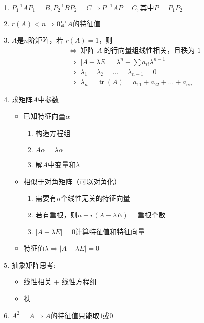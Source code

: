 \documentclass[a4paper,12pt]{article}
\begin{document}
\begin{enumerate}
\begin{align*}
            \text{ 则 } A(P\bm{\alpha}_B) = \lambda (P\bm{\alpha}_B)
            \Rightarrow {\color{red}{\bm{\alpha}_A = P\bm{\alpha}_B}}
        \end{align*}
        \item $P_1^{-1}AP_1 = B, P_2^{-1}BP_2 = C \Rightarrow P^{-1}AP = C, \text{其中}P = P_{1}P_2$
        \item $r(A) < n \Rightarrow 0 \text{是} A \text{的特征值}$
        \item $A$是$n$阶矩阵，若 $r(A) = 1$，则
        \begin{align*}
            &\Leftrightarrow\; \text{矩阵 $A$ 的行向量组线性相关，且秩为 1}  \\
            &\Rightarrow\; |A - \lambda E| = \lambda^n - \sum a_{ii}\lambda^{n-1}  \\
            &\Rightarrow\; \lambda_1 = \lambda_2 = \dots = \lambda_{n-1} = 0  \\
            &\Rightarrow\; \lambda_n = \operatorname{tr}(A) = a_{11} + a_{22} + \dots + a_{nn}
        \end{align*}
        \item 求矩阵$A$中参数
        \begin{itemize}
            \item 已知特征向量$\alpha$
            \begin{enumerate}
                \item 构造方程组
                \item $A\alpha = \lambda \alpha$
                \item 解$A$中变量和$\lambda$
            \end{enumerate}
            \item 相似于对角矩阵（可以对角化）
            \begin{enumerate}
                \item 需要有$n$个线性无关的特征向量
                \item 若有重根，则$n - r(A - \lambda E) = \text{重根个数}$
                \item $|A - \lambda E| = 0$计算特征值和特征向量
            \end{enumerate}
            \item 特征值$\lambda \Rightarrow |A - \lambda E| = 0$
        \end{itemize}
        \item 抽象矩阵思考:
        \begin{itemize}
            \item 线性相关 + 线性方程组
            \item 秩
        \end{itemize}
        \item $A^2 = A \Rightarrow A$的特征值只能取$1$或$0$
    \end{enumerate}
\end{document}
